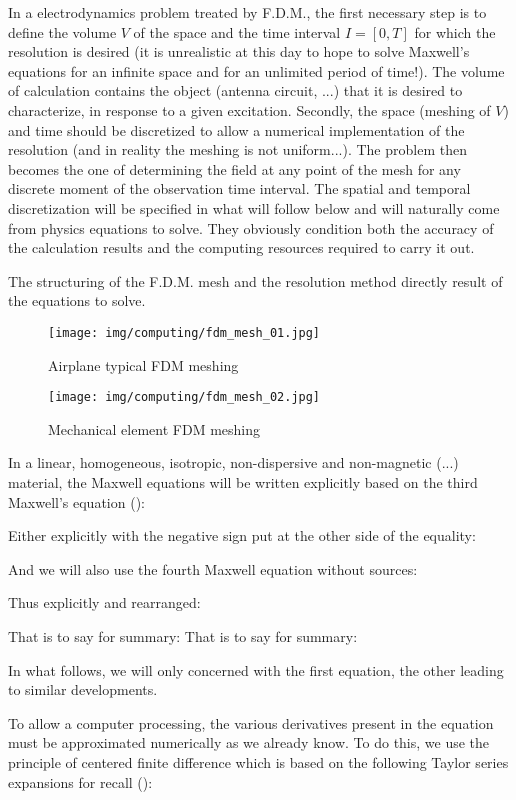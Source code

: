 	In a electrodynamics problem treated by F.D.M., the first necessary step is to define the volume $V$ of the space and the time interval $I = [0, T]$ for which the resolution is desired (it is unrealistic at this day to hope to solve Maxwell's equations for an infinite space and for an unlimited period of time!). The volume of calculation contains the object (antenna circuit, ...) that it is desired to characterize, in response to a given excitation. Secondly, the space (meshing of $V$) and time should be discretized to allow a numerical implementation of the resolution (and in reality the meshing is not uniform...). The problem then becomes the one of determining the field at any point of the mesh for any discrete moment of the observation time interval. The spatial and temporal discretization will be specified in what will follow below and will naturally come from physics equations to solve. They obviously condition both the accuracy of the calculation results and the computing resources required to carry it out.

	The structuring of the F.D.M. mesh and the resolution method directly result of the equations to solve.
	\begin{figure}[H]
		\centering
		\texttt{[image: img/computing/fdm\_mesh\_01.jpg]}
		\caption{Airplane typical FDM meshing}
	\end{figure}
	\begin{figure}[H]
		\centering
		\texttt{[image: img/computing/fdm\_mesh\_02.jpg]}
		\caption{Mechanical element FDM meshing}
	\end{figure}
	In a linear, homogeneous, isotropic, non-dispersive and non-magnetic (...) material, the Maxwell equations will be written explicitly based on the third Maxwell's equation ():
	
	Either explicitly with the negative sign put at the other side of the equality:
	
	And we will also use the fourth Maxwell equation without sources:
	
	Thus explicitly and rearranged:
	
	That is to say for summary:
	That is to say for summary:
	
	In what follows, we will only concerned with the first equation, the other leading to similar developments.

	To allow a computer processing, the various derivatives present in the equation must be approximated numerically as we already know. To do this, we use the principle of centered finite difference which is based on the following Taylor series expansions for recall ():
	
